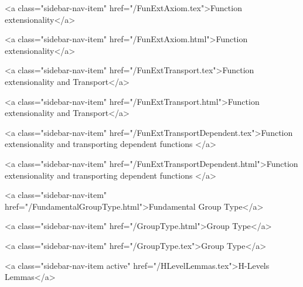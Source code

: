       
    
      
        
          <a class="sidebar-nav-item" href="/FunExtAxiom.tex">Function extensionality</a>
        
      
    
      
        
          <a class="sidebar-nav-item" href="/FunExtAxiom.html">Function extensionality</a>
        
      
    
      
        
          <a class="sidebar-nav-item" href="/FunExtTransport.tex">Function extensionality and Transport</a>
        
      
    
      
        
          <a class="sidebar-nav-item" href="/FunExtTransport.html">Function extensionality and Transport</a>
        
      
    
      
        
          <a class="sidebar-nav-item" href="/FunExtTransportDependent.tex">Function extensionality and transporting dependent functions </a>
        
      
    
      
        
          <a class="sidebar-nav-item" href="/FunExtTransportDependent.html">Function extensionality and transporting dependent functions </a>
        
      
    
      
        
          <a class="sidebar-nav-item" href="/FundamentalGroupType.html">Fundamental Group Type</a>
        
      
    
      
        
          <a class="sidebar-nav-item" href="/GroupType.html">Group Type</a>
        
      
    
      
        
          <a class="sidebar-nav-item" href="/GroupType.tex">Group Type</a>
        
      
    
      
        
          <a class="sidebar-nav-item active" href="/HLevelLemmas.tex">H-Levels Lemmas</a>
        
      
    
